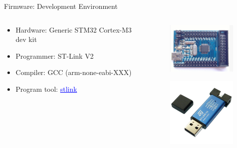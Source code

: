 \begin{frame}{Firmware: Development Environment}

    \begin{columns}[t]
        \begin{column}[t]{0.6\textwidth}
            \begin{itemize}
                \vspace{0.4cm}
                \item Hardware: Generic STM32 Cortex-M3 dev kit
                \vspace{0.4cm}
                \item Programmer: ST-Link V2
                \vspace{0.4cm}
                \item Compiler: GCC (arm-none-eabi-XXX)
                \vspace{0.4cm}
                \item Program tool: \href{https://github.com/stlink-org/stlink}{\textcolor{blue}{\underline{stlink}}}
            \end{itemize}
        \end{column}
        \begin{column}[t]{0.4\textwidth}
            \begin{figure}[!ht]
                \begin{center}
                    \includegraphics[width=4cm]{figures/stm32-dev-kit}
                \end{center}
            \end{figure}
            \begin{figure}[!ht]
                \begin{center}
                    \includegraphics[width=3.5cm]{figures/stlink-v2}
                \end{center}
            \end{figure}
        \end{column}
    \end{columns}
\end{frame}

